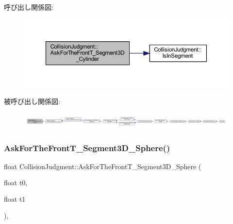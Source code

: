 呼び出し関係図\+:\nopagebreak
\begin{figure}[H]
\begin{center}
\leavevmode
\includegraphics[width=350pt]{class_collision_judgment_a413d713064c810f1bea6760e76db5221_cgraph}
\end{center}
\end{figure}
被呼び出し関係図\+:
\nopagebreak
\begin{figure}[H]
\begin{center}
\leavevmode
\includegraphics[width=350pt]{class_collision_judgment_a413d713064c810f1bea6760e76db5221_icgraph}
\end{center}
\end{figure}
\mbox{\label{class_collision_judgment_adbf036202ba174c7e9fc10329aeaa2c1}} 
\subsubsection{\texorpdfstring{Ask\+For\+The\+Front\+T\+\_\+\+Segment3\+D\+\_\+\+Sphere()}{AskForTheFrontT\_Segment3D\_Sphere()}}
{\footnotesize\ttfamily float Collision\+Judgment\+::\+Ask\+For\+The\+Front\+T\+\_\+\+Segment3\+D\+\_\+\+Sphere (\begin{DoxyParamCaption}\item[{float}]{t0,  }\item[{float}]{t1 }\end{DoxyParamCaption})\hspace{0.3cm}{\ttfamily [static]}, {\ttfamily [private]}}



